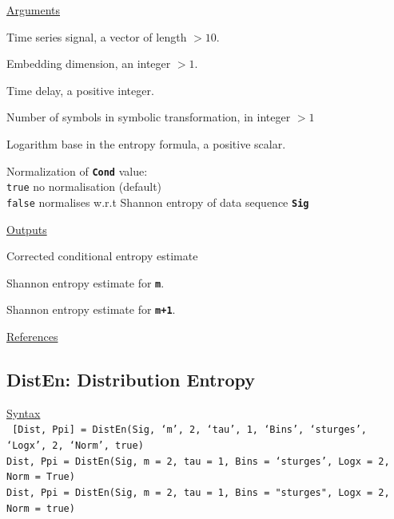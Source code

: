 \documentclass[12pt, a4paper, titlepage, openany]{book}
\begin{document}
\noindent \ul{Arguments}
\begin{description}[labelsep=1cm, labelwidth=2cm, nosep, style=multiline,leftmargin=3cm]\footnotesize
\item[\texttt{Sig}]		Time series signal, a vector of length $> 10$.
\item[\texttt{m}]		Embedding dimension, an integer $> 1$.
\item[\texttt{tau}]		Time delay, a positive integer.
\item[\texttt{c}]		Number of symbols in symbolic transformation, in integer $> 1$
\item[\texttt{Logx}]	Logarithm base in the entropy formula, a positive scalar.
\item[\texttt{Norm}]	Normalization of \texttt{\textbf{Cond}} value:\\
		  \texttt{true} \hspace{15pt}  no normalisation (default)\\
		  \texttt{false} \hspace{10pt}  normalises w.r.t Shannon entropy of data sequence \texttt{\textbf{Sig}}
\end{description}

\noindent \ul{Outputs}
\begin{description}[labelsep=1cm, labelwidth=2cm, nosep, style=multiline,leftmargin=3cm]\footnotesize
\item[\texttt{Cond}]		Corrected conditional entropy estimate
\item[\texttt{SEw}]		Shannon entropy estimate for \texttt{\textbf{m}}.
\item[\texttt{SEz}]		Shannon entropy estimate for \texttt{\textbf{m+1}}.
\end{description}

\noindent \ul{References}\hspace{1cm}
\cite{Cond1}



\newpage
\subsection{\normalsize DistEn: \hspace{15mm} Distribution Entropy}
\noindent\ul{Syntax} \vspace{6mm} \\ \noindent \texttt{\footnotesize
[Dist, Ppi] = DistEn(Sig, ‘m’, 2, ‘tau’, 1, ‘Bins’, ‘sturges’, ‘Logx’, 2, ‘Norm’, true)\\
 Dist, Ppi  = DistEn(Sig, m = 2, tau = 1, Bins = ‘sturges’, Logx = 2, Norm = True)\\ 
 Dist, Ppi  = DistEn(Sig, m = 2, tau = 1, Bins = "sturges", Logx = 2, Norm = true)}
\end{document}

